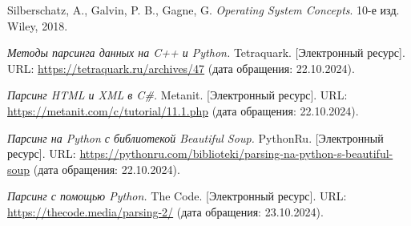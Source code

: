
\renewcommand{\refname}{\begin{center}\MakeUppercase{Список использованных источников}\end{center}}

\begin{thebibliography}{9}

Silberschatz, A., Galvin, P. B., Gagne, G. \textit{Operating System Concepts}. 10-е изд. Wiley, 2018.

\textit{Методы парсинга данных на C++ и Python.} Tetraquark. [Электронный ресурс]. URL: \url{https://tetraquark.ru/archives/47} (дата обращения: 22.10.2024).

\textit{Парсинг HTML и XML в C\#.} Metanit. [Электронный ресурс]. URL: \url{https://metanit.com/c/tutorial/11.1.php} (дата обращения: 22.10.2024).

\textit{Парсинг на Python с библиотекой Beautiful Soup.} PythonRu. [Электронный ресурс]. URL: \url{https://pythonru.com/biblioteki/parsing-na-python-s-beautiful-soup} (дата обращения: 22.10.2024).

\textit{Парсинг с помощью Python.} The Code. [Электронный ресурс]. URL: \url{https://thecode.media/parsing-2/} (дата обращения: 23.10.2024).
  
\end{thebibliography}
